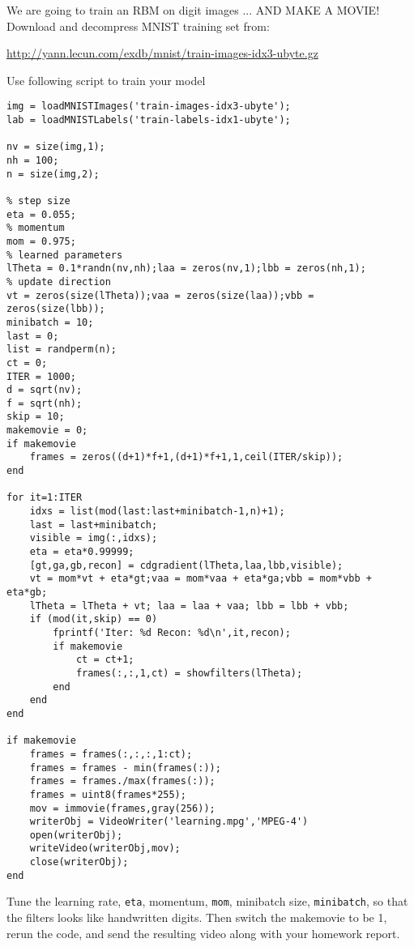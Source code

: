 \documentclass{article}
\begin{document}
\newproblem{2pt}
We are going to train an RBM on digit images ... AND MAKE A MOVIE!
Download and decompress  MNIST training set from:

\url{http://yann.lecun.com/exdb/mnist/train-images-idx3-ubyte.gz}

Use following script to train your model
\begin{verbatim}
img = loadMNISTImages('train-images-idx3-ubyte');
lab = loadMNISTLabels('train-labels-idx1-ubyte');

nv = size(img,1);
nh = 100;
n = size(img,2);

% step size
eta = 0.055;
% momentum
mom = 0.975;
% learned parameters
lTheta = 0.1*randn(nv,nh);laa = zeros(nv,1);lbb = zeros(nh,1);
% update direction
vt = zeros(size(lTheta));vaa = zeros(size(laa));vbb = zeros(size(lbb));
minibatch = 10;
last = 0;
list = randperm(n);
ct = 0;
ITER = 1000;
d = sqrt(nv);
f = sqrt(nh);
skip = 10;
makemovie = 0;
if makemovie
    frames = zeros((d+1)*f+1,(d+1)*f+1,1,ceil(ITER/skip));
end

for it=1:ITER
    idxs = list(mod(last:last+minibatch-1,n)+1);
    last = last+minibatch;
    visible = img(:,idxs);
    eta = eta*0.99999;
    [gt,ga,gb,recon] = cdgradient(lTheta,laa,lbb,visible);
    vt = mom*vt + eta*gt;vaa = mom*vaa + eta*ga;vbb = mom*vbb + eta*gb;
    lTheta = lTheta + vt; laa = laa + vaa; lbb = lbb + vbb;
    if (mod(it,skip) == 0)
        fprintf('Iter: %d Recon: %d\n',it,recon);
        if makemovie
            ct = ct+1;
            frames(:,:,1,ct) = showfilters(lTheta);
        end
    end
end

if makemovie
    frames = frames(:,:,:,1:ct);
    frames = frames - min(frames(:));
    frames = frames./max(frames(:));
    frames = uint8(frames*255);
    mov = immovie(frames,gray(256));
    writerObj = VideoWriter('learning.mpg','MPEG-4')
    open(writerObj);
    writeVideo(writerObj,mov);
    close(writerObj);
end
\end{verbatim}
Tune the learning rate, \verb|eta|, momentum, \verb|mom|, minibatch size, \verb|minibatch|, so that
the filters looks like handwritten digits. Then switch the makemovie to be 1, rerun the code, and send the resulting video along with your homework report.
\end{document}

